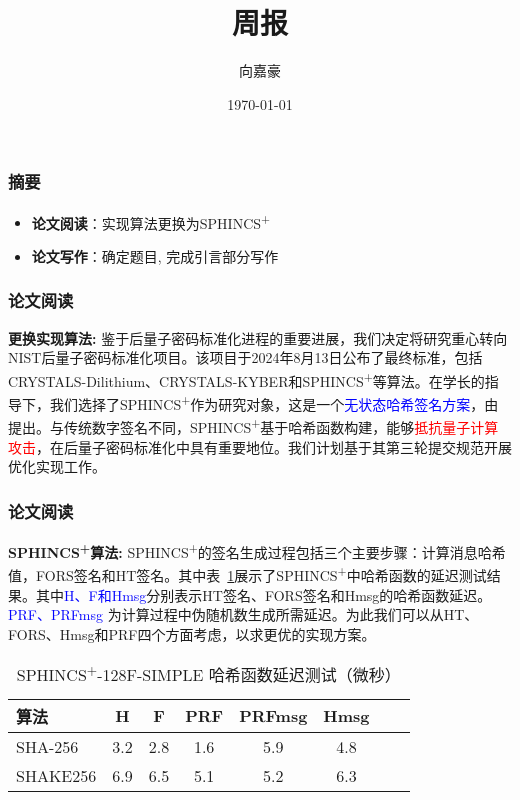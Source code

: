 \documentclass{beamer}
\title{\textbf{周报}}
\author{向嘉豪}
\institute{衡阳师范学院}
\date{\today}
\begin{document}
\begin{frame}
  \titlepage
\end{frame}

\begin{frame}
  \frametitle{摘要}
  \begin{itemize}
    \item \textbf{论文阅读}：实现算法更换为SPHINCS\textsuperscript{+}
    \item \textbf{论文写作}：确定题目, 完成引言部分写作
  \end{itemize}
\end{frame}

\begin{frame}
  \frametitle{论文阅读}
  \noindent \textbf{更换实现算法: } 鉴于后量子密码标准化进程的重要进展，我们决定将研究重心转向NIST后量子密码标准化项目。该项目于2024年8月13日公布了最终标准，包括CRYSTALS-Dilithium、CRYSTALS-KYBER和SPHINCS\textsuperscript{+}等算法。在学长的指导下，我们选择了SPHINCS\textsuperscript{+}作为研究对象，这是一个\textcolor{blue}{无状态哈希签名方案}，由\cite{Bernstein2019}提出。与传统数字签名不同，SPHINCS\textsuperscript{+}基于哈希函数构建，能够\textcolor{red}{抵抗量子计算攻击}，在后量子密码标准化中具有重要地位。我们计划基于其第三轮提交规范开展优化实现工作。

\end{frame}

\begin{frame}
  \frametitle{论文阅读}

  \noindent \textbf{SPHINCS\textsuperscript{+}算法: } SPHINCS\textsuperscript{+}的签名生成过程包括三个主要步骤：计算消息哈希值，FORS签名和HT签名。其中表~\ref{tab:hash_latency}展示了SPHINCS\textsuperscript{+}中哈希函数的延迟测试结果。其中\textcolor{blue}{H、F和Hmsg}分别表示HT签名、FORS签名和Hmsg的哈希函数延迟。\textcolor{blue}{PRF、PRFmsg} 为计算过程中伪随机数生成所需延迟。为此我们可以从HT、FORS、Hmsg和PRF四个方面考虑，以求更优的实现方案。

  \begin{table}[htbp]
    \centering
    \caption{SPHINCS\textsuperscript{+}-128F-SIMPLE 哈希函数延迟测试（微秒）\cite{Wang2025}}
    \label{tab:hash_latency}
    \begin{tabular}{lccccccc}
      \toprule
      算法 & H & F & PRF & PRFmsg & Hmsg \\
      \midrule
      SHA-256  & 3.2 & 2.8 & 1.6 & 5.9 & 4.8 \\
      SHAKE256  & 6.9 & 6.5 & 5.1 & 5.2 & 6.3 \\
      \bottomrule
    \end{tabular}
  \end{table}
\end{frame}
\end{document}

